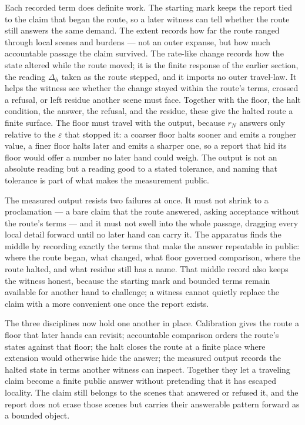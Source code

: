 Each recorded term does definite work. The starting mark keeps the report tied to the claim that began the route, so a later witness can tell whether the route still answers the same demand. The extent records how far the route ranged through local scenes and burdens --- not an outer expanse, but how much accountable passage the claim survived. The rate-like change records how the state altered while the route moved; it is the finite response of the earlier section, the reading $\Delta_h$ taken as the route stepped, and it imports no outer travel-law. It helps the witness see whether the change stayed within the route's terms, crossed a refusal, or left residue another scene must face. Together with the floor, the halt condition, the answer, the refusal, and the residue, these give the halted route a finite surface. The floor must travel with the output, because $r_N$ answers only relative to the $\varepsilon$ that stopped it: a coarser floor halts sooner and emits a rougher value, a finer floor halts later and emits a sharper one, so a report that hid its floor would offer a number no later hand could weigh. The output is not an absolute reading but a reading good to a stated tolerance, and naming that tolerance is part of what makes the measurement public.

The measured output resists two failures at once. It must not shrink to a proclamation --- a bare claim that the route answered, asking acceptance without the route's terms --- and it must not swell into the whole passage, dragging every local detail forward until no later hand can carry it. The apparatus finds the middle by recording exactly the terms that make the answer repeatable in public: where the route began, what changed, what floor governed comparison, where the route halted, and what residue still has a name. That middle record also keeps the witness honest, because the starting mark and bounded terms remain available for another hand to challenge; a witness cannot quietly replace the claim with a more convenient one once the report exists.

The three disciplines now hold one another in place. Calibration gives the route a floor that later hands can revisit; accountable comparison orders the route's states against that floor; the halt closes the route at a finite place where extension would otherwise hide the answer; the measured output records the halted state in terms another witness can inspect. Together they let a traveling claim become a finite public answer without pretending that it has escaped locality. The claim still belongs to the scenes that answered or refused it, and the report does not erase those scenes but carries their answerable pattern forward as a bounded object.

